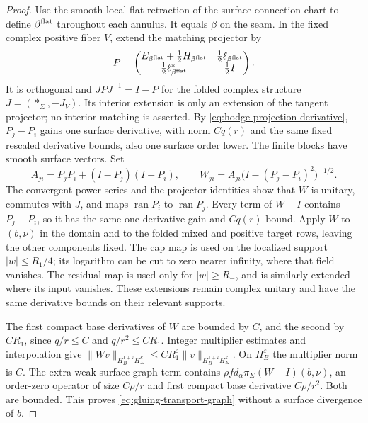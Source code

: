 \documentclass[11pt]{amsart}
\theoremstyle{definition}
\theoremstyle{remark}
\theoremstyle{plain}
\begin{document}
\begin{proof}
Use the smooth local flat retraction of the surface-connection chart
to define $\beta^{\rm flat}$ throughout each annulus. It equals
$\beta$ on the seam. In the fixed complex positive fiber $V$,
extend the matching projector by
\[
 P=\begin{pmatrix}
 E_{\beta^{\rm flat}}+\tfrac12H_{\beta^{\rm flat}}
                         &\tfrac12\ell_{\beta^{\rm flat}}\\
 \tfrac12\ell_{\beta^{\rm flat}}^*&\tfrac12 I
 \end{pmatrix}.
\]
It is orthogonal and $JPJ^{-1}=I-P$ for the folded complex
structure $J=(*_\Sigma,-J_V)$. Its interior extension is only
an extension of the tangent projector; no interior matching is
asserted. By \eqref{eq:hodge-projection-derivative}, $P_j-P_i$
gains one surface derivative, with norm $Cq(r)$ and the same
fixed rescaled derivative bounds, also one surface order lower.
The finite blocks have smooth surface vectors. Set
\[
 A_{ji}=P_jP_i+(I-P_j)(I-P_i),\qquad
 W_{ji}=A_{ji}\bigl(I-(P_j-P_i)^2\bigr)^{-1/2}.
\]
The convergent power series and the projector identities show that
$W$ is unitary, commutes with $J$, and maps $\operatorname{ran}P_i$
to $\operatorname{ran}P_j$. Every term of $W-I$ contains
$P_j-P_i$, so it has the same one-derivative gain and $Cq(r)$
bound. Apply $W$ to $(b,\nu)$ in the domain and to the folded
mixed and positive target rows, leaving the other components fixed.
The cap map is used on the localized support $|w|\leq R_1/4$;
its logarithm can be cut to zero nearer infinity, where that field
vanishes. The residual map is used only for $|w|\geq R_-$,
and is similarly extended where its input vanishes. These extensions
remain complex unitary and have the same derivative bounds on their
relevant supports.

The first compact base derivatives of $W$ are bounded by $C$,
and the second by $CR_1$, since $q/r\leq C$ and $q/r^2\leq CR_1$.
Integer multiplier estimates and interpolation give
$\|Wv\|_{H^{1+\varepsilon}_BH^k_\Sigma}
\leq CR_1^\varepsilon\|v\|_{H^{1+\varepsilon}_BH^k_\Sigma}$.
On $H^\varepsilon_B$ the multiplier norm is $C$.
The extra weak surface graph term contains
$\rho f d_\alpha\pi_\Sigma(W-I)(b,\nu)$, an order-zero
operator of size $C\rho/r$ and first compact base derivative
$C\rho/r^2$. Both are bounded. This proves
\eqref{eq:gluing-transport-graph} without a surface divergence
of $b$.


\end{proof}
\end{document}
